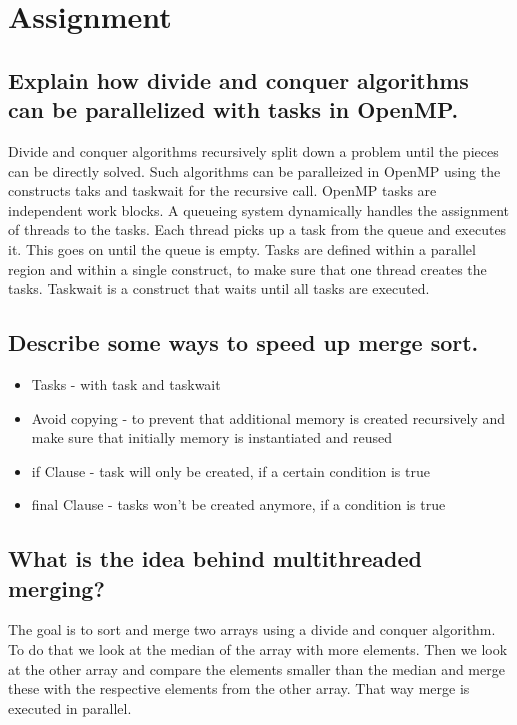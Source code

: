 \documentclass[runningheads]{llncs}
\begin{document}
\section{Assignment}

\subsection{Explain how divide and conquer algorithms can be parallelized with tasks in OpenMP.}
Divide and conquer algorithms recursively split down a problem until the pieces can be directly solved.
Such algorithms can be paralleized in OpenMP using the constructs taks and taskwait for the recursive call.
OpenMP tasks are independent work blocks. 
A queueing system dynamically handles the assignment of threads to the tasks. 
Each thread picks up a task from the queue and executes it. 
This goes on until the queue is empty. 
Tasks are defined within a parallel region and within a single construct, to make sure that one thread creates the tasks.
Taskwait is a construct that waits until all tasks are executed.

\subsection{Describe some ways to speed up merge sort.}
\begin{itemize}
	\item Tasks - with task and taskwait
	\item Avoid copying - to prevent that additional memory is created recursively and make sure that initially memory 
	is instantiated and reused
	\item if Clause - task will only be created, if a certain condition is true
	\item final Clause - tasks won't be created anymore, if a condition is true
\end{itemize}


\subsection{What is the idea behind multithreaded merging?}
The goal is to sort and merge two arrays using a divide and conquer algorithm. To do that we look at the median of the
array with more elements. Then we look at the other array and compare the elements smaller than the median and merge these
with the respective elements from the other array. That way merge is executed in parallel.
\end{document}
